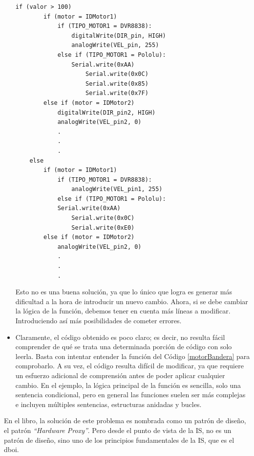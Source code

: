 \begin{itemize}
\begin{lstlisting}[caption=Modificación de la función controlar\_motor para utilizar bandera indicadora de tipo de placa controladora.,label={motorBandera}]
	if (valor > 100)
		if (motor = IDMotor1)
			if (TIPO_MOTOR1 = DVR8838):
			    digitalWrite(DIR_pin, HIGH)
	    		analogWrite(VEL_pin, 255)
			else if (TIPO_MOTOR1 = Pololu):
    			Serial.write(0xAA)
					Serial.write(0x0C)
					Serial.write(0x85)
					Serial.write(0x7F)
		else if (motor = IDMotor2)
	    	digitalWrite(DIR_pin2, HIGH)
	    	analogWrite(VEL_pin2, 0)
	    	.
	    	.
	    	.
	else
		if (motor = IDMotor1)
			if (TIPO_MOTOR1 = DVR8838):
				analogWrite(VEL_pin1, 255)
			else if (TIPO_MOTOR1 = Pololu):
	    	Serial.write(0xAA)
				Serial.write(0x0C)
				Serial.write(0xE0)
	    else if (motor = IDMotor2)
	    	analogWrite(VEL_pin2, 0)
	    	.
	    	.
	    	.

\end{lstlisting}

Esto no es una buena solución, ya que lo único que logra es generar más dificultad a la hora de introducir un nuevo cambio. Ahora, si se debe cambiar la lógica de la función, debemos tener en cuenta más líneas a modificar. Introduciendo así más posibilidades de cometer errores.

    \item Claramente, el código obtenido es poco claro; es decir, no resulta fácil comprender de qué se trata una determinada porción de código con solo leerla. Basta con intentar entender la función del Código \ref{motorBandera} para comprobarlo. A su vez, el código resulta difícil de modificar, ya que requiere un esfuerzo adicional de comprensión antes de poder aplicar cualquier cambio. En el ejemplo, la lógica principal de la función es sencilla, solo una sentencia condicional, pero en general las funciones suelen ser más complejas e incluyen múltiples sentencias, estructuras anidadas y bucles.


\end{itemize}

En el libro, la solución de este problema es nombrada como un patrón de diseño, el patrón \textit{``Hardware Proxy''}. Pero desde el punto de vista de la IS, no es un patrón de diseño, sino uno de los principios fundamentales de la  IS, que es el \gls{dboi}.


